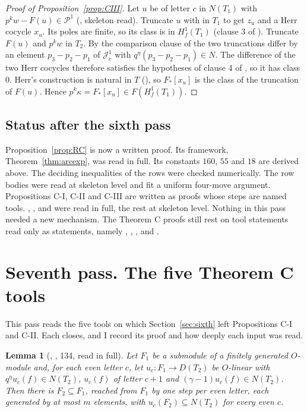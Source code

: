 \documentclass[11pt]{article}
\newcommand{\Pp}{\mathcal P}
\newtheorem{lemma}{Lemma}
\theoremstyle{definition}
\theoremstyle{remark}
\begin{document}
\begin{proof}[Proof of Proposition~\ref{prop:CIII}]
Let $u$ be of letter $c$ in $N(T_1)$ with $p^kw-F(u)\in\Pp^1$ (, skeleton read). Truncate $u$ with  in $T_1$ to get $z_u$ and a Herr cocycle $x_u$. Its poles are finite, so its class is in $H^1_f(T_1)$ (clause 3 of ). Truncate $F(u)$ and $p^kw$ in $T_2$. By the comparison clause of  the two truncations differ by an element $p_3-p_2-p_1$ of $\mathcal J^1_c$ with $q^\eta(p_3-p_2-p_1)\in N$. The difference of the two Herr cocycles therefore satisfies the hypotheses of clause 4 of , so it has class $0$. Herr's construction is natural in $T$ (), so $F_*[x_u]$ is the class of the truncation of $F(u)$. Hence $p^k\kappa=F_*[x_u]\in F(H^1_f(T_1))$.
\end{proof}

\subsection*{Status after the sixth pass}

Proposition~\ref{prop:RC} is now a written proof. Its framework, Theorem~\ref{thm:arcexp}, was read in full. Its constants $160$, $55$ and $18$ are derived above. The deciding inequalities of the rows were checked numerically. The row bodies were read at skeleton level and fit a uniform four-move argument. Propositions C-I, C-II and C-III are written as proofs whose steps are named tools. , ,  and  were read in full, the rest at skeleton level. Nothing in this pass needed a new mechanism. The Theorem C proofs still rest on tool statements read only as statements, namely , , ,  and .

\section{Seventh pass. The five Theorem C tools}\label{sec:seventh}

This pass reads the five tools on which Section~\ref{sec:sixth} left Propositions C-I and C-II. Each closes, and I record its proof and how deeply each input was read.

\begin{lemma}[, , 134, read in full]
Let $F_1$ be a submodule of a finitely generated $O$-module and, for each even letter $c$, let $u_c\colon F_1\to D(T_2)$ be $O$-linear with $q^\eta u_c(f)\in N(T_2)$, $u_c(f)$ of letter $c+1$ and $(\gamma-1)u_c(f)\in N(T_2)$. Then there is $F_2\subseteq F_1$, reached from $F_1$ by one step per even letter, each generated by at most $m$ elements, with $u_c(F_2)\subseteq N(T_2)$ for every even $c$.
\end{lemma}
\end{document}
